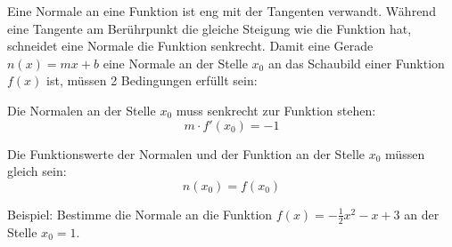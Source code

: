 Eine Normale an eine Funktion ist eng mit der Tangenten verwandt. Während eine Tangente am Berührpunkt die gleiche Steigung wie die Funktion hat, schneidet eine Normale die Funktion senkrecht. Damit eine Gerade \(n(x)=mx+b\) eine Normale an der Stelle \(x_0\) an das Schaubild einer Funktion \(f(x)\) ist, müssen 2 Bedingungen erfüllt sein:
\begin{tcolorbox}

    \bigskip

	\textcolor{loestc}{Die Normalen an der Stelle \(x_0\) muss senkrecht zur Funktion stehen:
		\[m\cdot f'(x_0)=-1\]}
\end{tcolorbox}
\begin{tcolorbox}

    \bigskip

	\textcolor{loestc}{Die Funktionswerte der Normalen und der Funktion an der Stelle \(x_0\) müssen gleich sein:
		\[n(x_0)=f(x_0)\]}
\end{tcolorbox}
Beispiel: Bestimme die Normale an die Funktion \(f(x)=-\frac{1}{2}x^2-x+3\) an der Stelle \(x_0=1\).\vspace{0.5cm}
\begin{minipage}{\textwidth}
\end{minipage}\newpage
